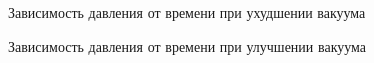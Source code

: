 \documentclass[a4paper,12pt]{article} %
\begin{document}
\begin{figure}[h]
\caption{Зависимость давления от времени при ухудшении вакуума}
\end{figure}

\begin{figure}[h]
\caption{Зависимость давления от времени при улучшении вакуума}
\end{figure}


\medskip
\end{document}
